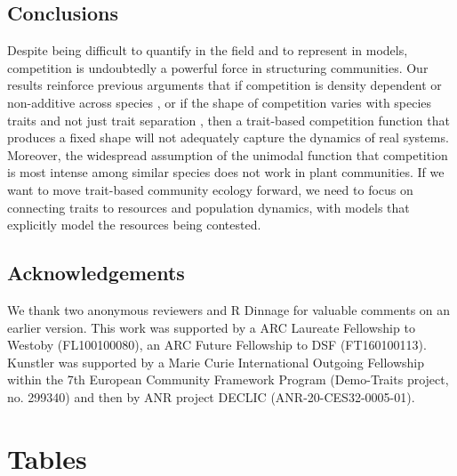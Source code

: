 \documentclass[a4paper,11pt]{article}
\begin{document}
\subsection{Conclusions}

Despite being difficult to quantify in the field and to represent in models, competition is undoubtedly a powerful force in structuring communities. Our results reinforce previous arguments that if competition is density dependent or non-additive across species \citep{Abrams-1980, Abrams-2008, Letten-2019}, or if the shape of competition varies with species traits and not just trait separation \citep{Abrams-2008, Song-2019}, then a trait-based competition function that produces a fixed shape will not adequately capture the dynamics of real systems. Moreover, the widespread assumption of the unimodal function that competition is most intense among similar species does not work in plant communities. If we want to move trait-based community ecology forward, we need to focus on connecting traits to resources and population dynamics, with models that explicitly model the resources being contested.

\subsection{Acknowledgements}

We thank two anonymous reviewers and R Dinnage for valuable comments on an earlier version. This work was supported by a ARC Laureate Fellowship to Westoby (FL100100080), an ARC Future Fellowship to DSF (FT160100113). Kunstler was supported by a Marie Curie International Outgoing Fellowship within the 7th European Community Framework Program (Demo-Traits project, no. 299340) and then by ANR project DECLIC (ANR-20-CES32-0005-01).

\clearpage

\section{Tables}
\end{document}
